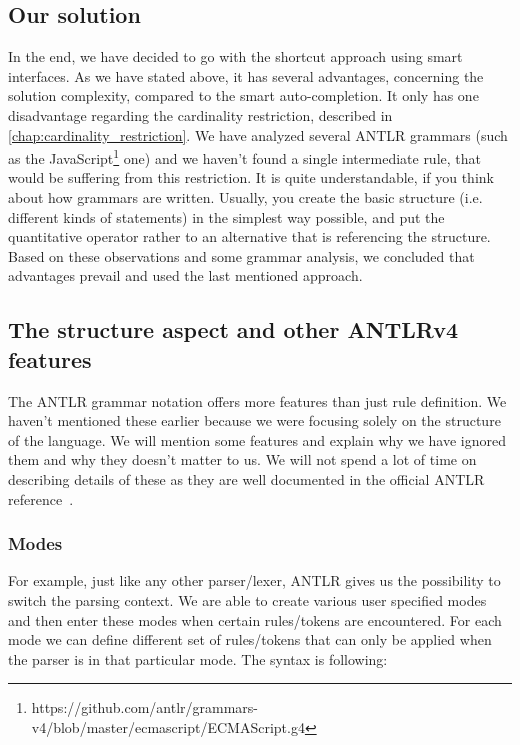 \pagebreak



\pagebreak

\subsection{Our solution}
\label{chap:structure_solution}

In the end, we have decided to go with the shortcut approach using smart interfaces.
As we have stated above, it has several advantages, concerning the solution complexity, compared to the smart auto-completion.
It only has one disadvantage regarding the cardinality restriction, described in \ref{chap:cardinality_restriction}.
We have analyzed several ANTLR grammars (such as the JavaScript\footnote{https://github.com/antlr/grammars-v4/blob/master/ecmascript/ECMAScript.g4} one) and we haven't found a single intermediate rule, that would be suffering from this restriction.
It is quite understandable, if you think about how grammars are written.
Usually, you create the basic structure (i.e. different kinds of statements) in the simplest way possible, and put the quantitative operator rather to an alternative that is referencing the structure.
\\

Based on these observations and some grammar analysis, we concluded that advantages prevail and used the last mentioned approach.

\subsection{The structure aspect and other ANTLRv4 features}

The ANTLR grammar notation offers more features than just rule definition.
We haven't mentioned these earlier because we were focusing solely on the structure of the language.
We will mention some features and explain why we have ignored them and why they doesn't matter to us.
We will not spend a lot of time on describing details of these as they are well documented in the official ANTLR reference~\cite{ANTLR4reference}.

\subsubsection{Modes}

For example, just like any other parser/lexer, ANTLR gives us the possibility to switch the parsing context.
We are able to create various user specified modes and then enter these modes when certain rules/tokens are encountered.
For each mode we can define different set of rules/tokens that can only be applied when the parser is in that particular mode.
The syntax is following:


